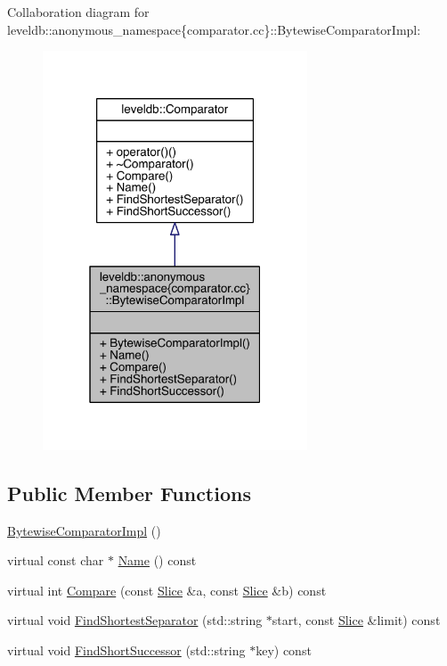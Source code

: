 Collaboration diagram for leveldb\+:\+:anonymous\+\_\+namespace\{comparator.\+cc\}\+:\+:Bytewise\+Comparator\+Impl\+:
\nopagebreak
\begin{figure}[H]
\begin{center}
\leavevmode
\includegraphics[width=223pt]{classleveldb_1_1anonymous__namespace_02comparator_8cc_03_1_1_bytewise_comparator_impl__coll__graph}
\end{center}
\end{figure}
\subsection*{Public Member Functions}
\begin{DoxyCompactItemize}
\item 
\hyperlink{classleveldb_1_1anonymous__namespace_02comparator_8cc_03_1_1_bytewise_comparator_impl_a85c693ae7b2461d36a5cf69cf3483ac2}{Bytewise\+Comparator\+Impl} ()
\item 
virtual const char $\ast$ \hyperlink{classleveldb_1_1anonymous__namespace_02comparator_8cc_03_1_1_bytewise_comparator_impl_a4059d0606a220312a2e49845635e1195}{Name} () const 
\item 
virtual int \hyperlink{classleveldb_1_1anonymous__namespace_02comparator_8cc_03_1_1_bytewise_comparator_impl_a7897df59bc5dc6a0abd2cd0171d3bb76}{Compare} (const \hyperlink{classleveldb_1_1_slice}{Slice} \&a, const \hyperlink{classleveldb_1_1_slice}{Slice} \&b) const 
\item 
virtual void \hyperlink{classleveldb_1_1anonymous__namespace_02comparator_8cc_03_1_1_bytewise_comparator_impl_a6f10d73f956da5a01579558bdeab64b8}{Find\+Shortest\+Separator} (std\+::string $\ast$start, const \hyperlink{classleveldb_1_1_slice}{Slice} \&limit) const 
\item 
virtual void \hyperlink{classleveldb_1_1anonymous__namespace_02comparator_8cc_03_1_1_bytewise_comparator_impl_a1cab7bff8b98bb315eb64d3711c06ea6}{Find\+Short\+Successor} (std\+::string $\ast$key) const 
\end{DoxyCompactItemize}


